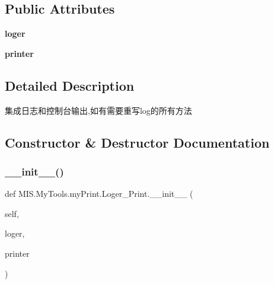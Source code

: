 \subsection*{Public Attributes}
\begin{DoxyCompactItemize}
\item 
\mbox{\label{classMIS_1_1MyTools_1_1myPrint_1_1Loger__Print_ad4c6d3fa6040e30da8e42747cd6a27e2}} 
{\bfseries loger}
\item 
\mbox{\label{classMIS_1_1MyTools_1_1myPrint_1_1Loger__Print_add406f10c2c0a6fc148feaf72f06bb1b}} 
{\bfseries printer}
\end{DoxyCompactItemize}


\subsection{Detailed Description}
\begin{DoxyVerb}集成日志和控制台输出,如有需要重写log的所有方法
\end{DoxyVerb}
 

\subsection{Constructor \& Destructor Documentation}
\mbox{\label{classMIS_1_1MyTools_1_1myPrint_1_1Loger__Print_a4c6f15d8a4593065730ac2e947d87ba9}} 
\subsubsection{\texorpdfstring{\+\_\+\+\_\+init\+\_\+\+\_\+()}{\_\_init\_\_()}}
{\footnotesize\ttfamily def M\+I\+S.\+My\+Tools.\+my\+Print.\+Loger\+\_\+\+Print.\+\_\+\+\_\+init\+\_\+\+\_\+ (\begin{DoxyParamCaption}\item[{}]{self,  }\item[{}]{loger,  }\item[{}]{printer }\end{DoxyParamCaption})}

